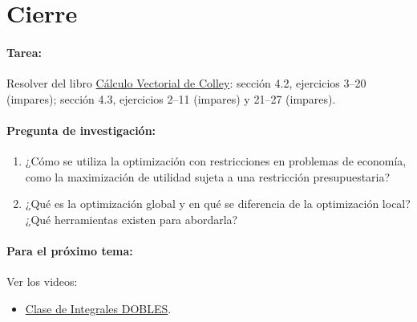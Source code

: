 \documentclass[a4,11pt]{aleph-notas}
\begin{document}
\section*{Cierre}

\paragraph{Tarea:}
Resolver del libro \href{https://catalogobiblioteca.puce.edu.ec/cgi-bin/koha/opac-detail.pl?biblionumber=83405&query_desc=su%3A%22An%C3%A1lisis%20vectorial%22}{Cálculo Vectorial de Colley}: sección 4.2, ejercicios 3--20 (impares); sección 4.3, ejercicios 2--11 (impares) y 21--27 (impares).

\paragraph{Pregunta de investigación:}
\begin{enumerate}[leftmargin=*]
    \item ¿Cómo se utiliza la optimización con restricciones en problemas de economía, como la maximización de utilidad sujeta a una restricción presupuestaria?
    \item ¿Qué es la optimización global y en qué se diferencia de la optimización local? ¿Qué herramientas existen para abordarla?
\end{enumerate}

\paragraph{Para el próximo tema:}
Ver los videos:
\begin{itemize}[leftmargin=*]
    \item \href{https://youtu.be/x078DTRvs9U?si=jvlG4Zj-ia1-gRnK}{Clase de Integrales DOBLES}.
\end{itemize}
\end{document}
